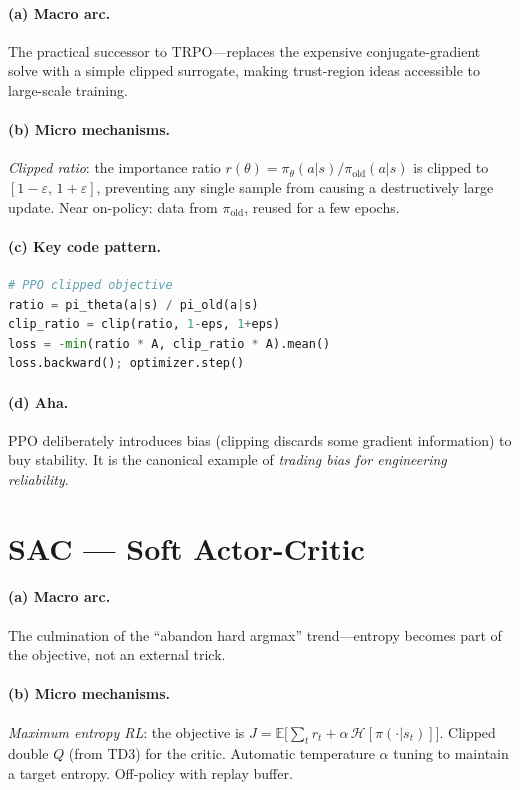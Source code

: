 \paragraph{(a) Macro arc.}
The practical successor to TRPO---replaces the expensive conjugate-gradient solve with a simple clipped surrogate, making trust-region ideas accessible to large-scale training.

\paragraph{(b) Micro mechanisms.}
\emph{Clipped ratio}: the importance ratio $r(\theta) = \pi_\theta(a|s)/\pi_{\text{old}}(a|s)$ is clipped to $[1{-}\varepsilon,\,1{+}\varepsilon]$, preventing any single sample from causing a destructively large update.
Near on-policy: data from $\pi_{\text{old}}$, reused for a few epochs.

\paragraph{(c) Key code pattern.}

\begin{lstlisting}[language=Python]
# PPO clipped objective
ratio = pi_theta(a|s) / pi_old(a|s)
clip_ratio = clip(ratio, 1-eps, 1+eps)
loss = -min(ratio * A, clip_ratio * A).mean()
loss.backward(); optimizer.step()
\end{lstlisting}

\paragraph{(d) Aha.}
PPO deliberately introduces bias (clipping discards some gradient information) to buy stability.
It is the canonical example of \emph{trading bias for engineering reliability}.

\section{SAC --- Soft Actor-Critic}
\label{sec:sac}

\paragraph{(a) Macro arc.}
The culmination of the ``abandon hard argmax'' trend---entropy becomes part of the objective, not an external trick.

\paragraph{(b) Micro mechanisms.}
\emph{Maximum entropy RL}: the objective is
$J = \mathbb{E}\bigl[\sum_t r_t + \alpha\,\mathcal{H}[\pi(\cdot|s_t)]\bigr]$.
Clipped double $Q$ (from TD3) for the critic.
Automatic temperature $\alpha$ tuning to maintain a target entropy.
Off-policy with replay buffer.

